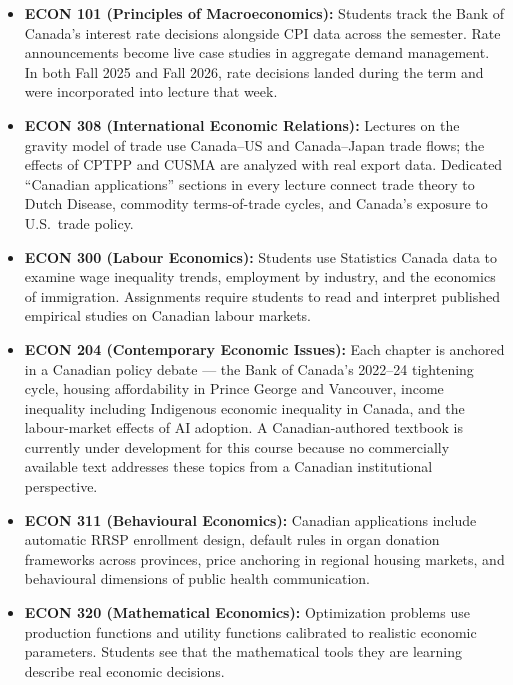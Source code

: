 \documentclass[11pt,letterpaper]{article}
\begin{document}
\begin{itemize}
  \item \textbf{ECON 101 (Principles of Macroeconomics):} Students track the Bank of Canada's interest rate decisions alongside CPI data across the semester. Rate announcements become live case studies in aggregate demand management. In both Fall 2025 and Fall 2026, rate decisions landed during the term and were incorporated into lecture that week.

  \item \textbf{ECON 308 (International Economic Relations):} Lectures on the gravity model of trade use Canada--US and Canada--Japan trade flows; the effects of CPTPP and CUSMA are analyzed with real export data. Dedicated ``Canadian applications'' sections in every lecture connect trade theory to Dutch Disease, commodity terms-of-trade cycles, and Canada's exposure to U.S.\ trade policy.

  \item \textbf{ECON 300 (Labour Economics):} Students use Statistics Canada data to examine wage inequality trends, employment by industry, and the economics of immigration. Assignments require students to read and interpret published empirical studies on Canadian labour markets.

  \item \textbf{ECON 204 (Contemporary Economic Issues):} Each chapter is anchored in a Canadian policy debate --- the Bank of Canada's 2022--24 tightening cycle, housing affordability in Prince George and Vancouver, income inequality including Indigenous economic inequality in Canada, and the labour-market effects of AI adoption. A Canadian-authored textbook is currently under development for this course because no commercially available text addresses these topics from a Canadian institutional perspective.

  \item \textbf{ECON 311 (Behavioural Economics):} Canadian applications include automatic RRSP enrollment design, default rules in organ donation frameworks across provinces, price anchoring in regional housing markets, and behavioural dimensions of public health communication.

  \item \textbf{ECON 320 (Mathematical Economics):} Optimization problems use production functions and utility functions calibrated to realistic economic parameters. Students see that the mathematical tools they are learning describe real economic decisions.
\end{itemize}
\end{document}
